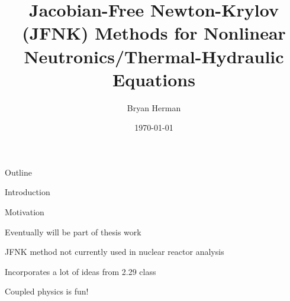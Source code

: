 \documentclass{beamer}
\title[JFNK Methods for Coupled Nonlinear Systems]{Jacobian-Free Newton-Krylov (JFNK) Methods for Nonlinear Neutronics/Thermal-Hydraulic Equations}
\author[]{Bryan Herman}
\institute[\insertpagenumber]{}
\date{\today}
\begin{document}

\frame{\titlepage}

\begin{frame}{Outline}
  \tableofcontents{}
\end{frame}

\begin{section}{Introduction}

\begin{frame}{Motivation}

  \begin{customlist}{2ex}{0pt}

    \item Eventually will be part of thesis work
    \vfill\item JFNK method not currently used in nuclear reactor 
		analysis
    \vfill\item Incorporates a lot of ideas from 2.29 class
    \vfill\item Coupled physics is fun!

  \end{customlist}


\end{frame}
\end{section}
\end{document}

